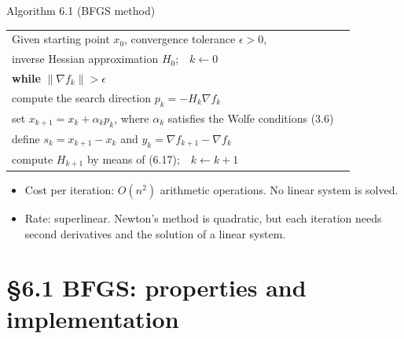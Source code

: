 \documentclass[aspectratio=169,12pt]{beamer}
\makeatletter
\newcommand{\gradf}{\nabla f}
\newcommand{\la}{\leftarrow}
\newcommand{\eqn}[1]{\text{\small(#1)}}
\newenvironment{algo}{\par\renewcommand{\arraystretch}{1.12}%
  \begin{tabular}{@{}l@{\hspace{2.2em}}l@{}}}{\end{tabular}\par}
\makeatother
\begin{document}
\begin{frame}{Algorithm 6.1 (BFGS method)}
  \begin{block}{}
    \begin{algo}
      Given starting point $x_{0}$, convergence tolerance $\epsilon>0$, & \\
      \qquad inverse Hessian approximation $H_{0}$;\ \ $k\la 0$ & \\
      \textbf{while} $\|\gradf_{k}\|>\epsilon$ & \\
      \qquad compute the search direction $p_{k}=-H_{k}\gradf_{k}$ & \eqn{6.18}\\
      \qquad set $x_{k+1}=x_{k}+\alpha_{k}p_{k}$, where $\alpha_{k}$ satisfies the Wolfe conditions (3.6) & \\
      \qquad define $s_{k}=x_{k+1}-x_{k}$ and $y_{k}=\gradf_{k+1}-\gradf_{k}$ & \\
      \qquad compute $H_{k+1}$ by means of (6.17);\ \ $k\la k+1$ & \\
    \end{algo}
  \end{block}

  \begin{itemize}\setlength\itemsep{0.3em}
    \item Cost per iteration: \alert{$O(n^{2})$} arithmetic operations. No linear system is solved.
    \item Rate: superlinear. Newton's method is quadratic, but each iteration needs second
      derivatives and the solution of a linear system.
  \end{itemize}
\end{frame}

\section{\S6.1 BFGS: properties and implementation}
\end{document}
